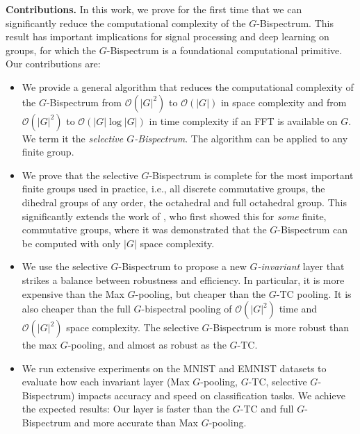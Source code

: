 \documentclass{article}
\theoremstyle{plain}
\theoremstyle{definition}
\theoremstyle{remark}
\begin{document}
\textbf{Contributions.} In this work, we prove for the first time that we can significantly reduce the computational complexity of the $G$-Bispectrum. This result has important implications for signal processing and deep learning on groups, for which the $G$-Bispectrum is a foundational computational primitive. Our contributions are:
\begin{itemize}[leftmargin=*]
    \item We provide a general algorithm that reduces the computational complexity of the $G$-Bispectrum from $\mathcal{O}(|G|^2)$ to $\mathcal{O}(|G|)$ in space complexity and from $\mathcal{O}(|G|^2)$ to $\mathcal{O}(|G|\log |G|)$ in time complexity if an FFT is available on $G$. %
    We term it the \textit{selective $G$-Bispectrum}. The algorithm can be applied to any finite group.
    \item We prove that the selective $G$-Bispectrum is complete for the most important finite groups used in practice, i.e., all discrete commutative groups, the dihedral groups of any order, the octahedral and full octahedral group. This significantly extends the work of \citep{giannakis1989signal, kakarala_thesis, sadler1992shift}, who first showed this for \textit{some} finite, commutative groups, where it was demonstrated that the $G$-Bispectrum can be computed with only $|G|$ space complexity.
    \item We use the selective $G$-Bispectrum to propose a new \textit{$G$-invariant} layer that strikes a balance between robustness and efficiency. In particular, it is more expensive than the Max $G$-pooling, %
    but cheaper than the $G$-TC pooling.%
     It is also cheaper than the full $G$-bispectral pooling of $\mathcal{O}(|G|^2)$ time and $\mathcal{O}(|G|^2)$ space complexity. The selective $G$-Bispectrum is more robust than the max $G$-pooling, and almost as robust as the $G$-TC.
    \item We run extensive experiments on the MNIST \citep{lecun2010mnist} and EMNIST \citep{cohen2017emnist} %
    datasets to evaluate how each invariant layer (Max $G$-pooling, $G$-TC, selective $G$-Bispectrum) impacts accuracy and speed on classification tasks. We achieve the expected results: Our layer is faster than the $G$-TC and full $G$-Bispectrum and more accurate than Max $G$-pooling.

\end{itemize}
\end{document}
